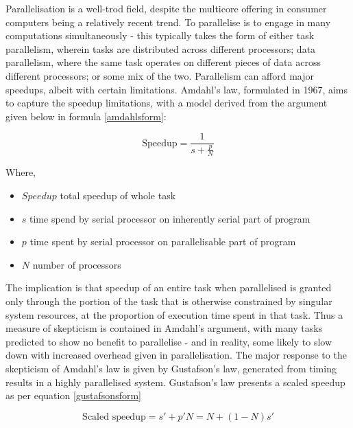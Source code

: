 Parallelisation is a well-trod field, despite the multicore offering in consumer computers being a relatively recent trend.
To parallelise is to engage in many computations simultaneously - this typically takes the form of either task parallelism, wherein tasks are distributed across different processors; data parallelism, where the same task operates on different pieces of data across different processors; or some mix of the two\cite{subhlok1993exploiting}.
Parallelism can afford major speedups, albeit with certain limitations.
Amdahl's law, formulated in 1967, aims to capture the speedup limitations, with a model derived from the argument given below in formula \ref{amdahlsform}\cite{amdahl1967law}\cite{gustafson1988law}:

\begin{equation}
        \label{amdahlsform}
        \textrm{Speedup} = \frac{1}{s+\frac{p}{N}}
\end{equation}

Where,

\begin{itemize}
        \item \(Speedup\) total speedup of whole task
        \item \(s\) time spend by serial processor on inherently serial part of program
        \item \(p\) time spent by serial processor on parallelisable part of program
        \item \(N\) number of processors
\end{itemize}

The implication is that speedup of an entire task when parallelised is granted only through the portion of the task that is otherwise constrained by singular system resources, at the proportion of execution time spent in that task.
Thus a measure of skepticism is contained in Amdahl's argument, with many tasks predicted to show no benefit to parallelise - and in reality, some likely to slow down with increased overhead given in parallelisation.
The major response to the skepticism of Amdahl's law is given by Gustafson's law, generated from timing results in a highly parallelised system\cite{gustafson1988law}.
Gustafson's law presents a scaled speedup as per equation \ref{gustafsonsform}

\begin{equation}
        \label{gustafsonsform}
        \textrm{Scaled speedup} = s' + p'N = N + (1-N)s'
\end{equation}

